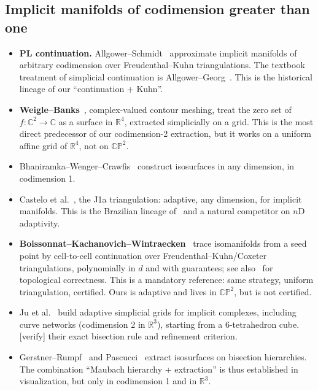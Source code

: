 \documentclass[11pt]{article}
\newcommand{\CP}{\mathbb{CP}}
\newcommand{\verify}{\textcolor{red!70!black}{\textsf{[verify]}}}
\begin{document}
\subsection{Implicit manifolds of codimension greater than one}
\begin{itemize}[leftmargin=*,itemsep=3pt]
\item \textbf{PL continuation.} Allgower--Schmidt~\cite{allgowerschmidt1985}
  approximate implicit manifolds of arbitrary codimension over
  Freudenthal--Kuhn triangulations. The textbook treatment of simplicial
  continuation is Allgower--Georg~\cite{allgowergeorg2003}. This is the
  historical lineage of our ``continuation + Kuhn''.
\item \textbf{Weigle--Banks}~\cite{weiglebanks1996}, complex-valued contour
  meshing, treat the zero set of $f:\mathbb C^2\to\mathbb C$ as a surface in
  $\mathbb R^4$, extracted simplicially on a grid. This is the most direct
  predecessor of our codimension-2 extraction, but it works on a uniform
  affine grid of $\mathbb R^4$, not on $\CP^2$.
\item Bhaniramka--Wenger--Crawfis~\cite{bwc2004} construct isosurfaces in
  any dimension, in codimension 1.
\item Castelo et al.~\cite{castelo2006}, the J1a triangulation: adaptive,
  any dimension, for implicit manifolds. This is the Brazilian lineage
  of~\cite{gomestavares1989} and a natural competitor on $n$D adaptivity.
\item \textbf{Boissonnat--Kachanovich--Wintraecken}~\cite{bkw2023} trace
  isomanifolds from a seed point by cell-to-cell continuation over
  Freudenthal--Kuhn/Coxeter triangulations, polynomially in $d$ and with
  guarantees; see also~\cite{boissonnatwintraecken2022} for topological
  correctness. This is a mandatory reference: same strategy, uniform
  triangulation, certified. Ours is adaptive and lives in $\CP^2$, but is
  not certified.
\item Ju et al.~\cite{ju2024} build adaptive simplicial grids for implicit
  complexes, including curve networks (codimension 2 in $\mathbb R^3$),
  starting from a 6-tetrahedron cube. \verify{} their exact bisection rule
  and refinement criterion.
\item Gerstner--Rumpf~\cite{gerstnerrumpf2000} and
  Pascucci~\cite{pascucci2002} extract isosurfaces on bisection
  hierarchies. The combination ``Maubach hierarchy + extraction'' is thus
  established in visualization, but only in codimension 1 and in
  $\mathbb R^3$.
\end{itemize}
\end{document}
